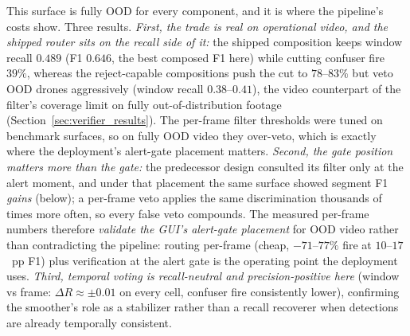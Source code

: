 
This surface is fully OOD for every component, and it is where the pipeline's costs show. Three results. \emph{First, the trade is real on operational video, and the shipped router sits on the recall side of it:} the shipped composition keeps window recall $0.489$ (F1 $0.646$, the best composed F1 here) while cutting confuser fire $39\%$, whereas the reject-capable compositions push the cut to $78$--$83\%$ but veto OOD drones aggressively (window recall $0.38$--$0.41$), the video counterpart of the filter's coverage limit on fully out-of-distribution footage (Section~\ref{sec:verifier_results}). The per-frame filter thresholds were tuned on benchmark surfaces, so on fully OOD video they over-veto, which is exactly where the deployment's alert-gate placement matters. \emph{Second, the gate position matters more than the gate:} the predecessor design consulted its filter only at the alert moment, and under that placement the same surface showed segment F1 \emph{gains} (below); a per-frame veto applies the same discrimination thousands of times more often, so every false veto compounds. The measured per-frame numbers therefore \emph{validate the GUI's alert-gate placement} for OOD video rather than contradicting the pipeline: routing per-frame (cheap, $-71$--$77\%$ fire at $10$--$17$~pp F1) plus verification at the alert gate is the operating point the deployment uses. \emph{Third, temporal voting is recall-neutral and precision-positive here} (window vs frame: $\Delta R \approx \pm 0.01$ on every cell, confuser fire consistently lower), confirming the smoother's role as a stabilizer rather than a recall recoverer when detections are already temporally consistent.

